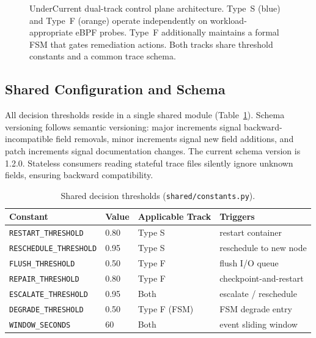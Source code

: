 \documentclass[runningheads]{llncs}
\begin{document}
\begin{figure}[t]
\caption{UnderCurrent dual-track control plane architecture.
Type~S (blue) and Type~F (orange) operate independently on
workload-appropriate eBPF probes. Type~F additionally maintains a
formal FSM that gates remediation actions. Both tracks share
threshold constants and a common trace schema.}
\label{fig:architecture}
\end{figure}

\subsection{Shared Configuration and Schema}

All decision thresholds reside in a single shared module
(Table~\ref{tab:thresholds}).  Schema versioning follows semantic
versioning: major increments signal backward-incompatible field
removals, minor increments signal new field additions, and patch
increments signal documentation changes.  The current schema version is
1.2.0. Stateless consumers reading stateful trace files silently ignore
unknown fields, ensuring backward compatibility.

\begin{table}[t]
\centering
\caption{Shared decision thresholds (\texttt{shared/constants.py}).}
\label{tab:thresholds}
\begin{tabular}{llll}
\toprule
\textbf{Constant} & \textbf{Value} & \textbf{Applicable Track} & \textbf{Triggers} \\
\midrule
\texttt{RESTART\_THRESHOLD}    & 0.80 & Type S        & restart container \\
\texttt{RESCHEDULE\_THRESHOLD} & 0.95 & Type S        & reschedule to new node \\
\texttt{FLUSH\_THRESHOLD}      & 0.50 & Type F        & flush I/O queue \\
\texttt{REPAIR\_THRESHOLD}     & 0.80 & Type F        & checkpoint-and-restart \\
\texttt{ESCALATE\_THRESHOLD}   & 0.95 & Both          & escalate / reschedule \\
\texttt{DEGRADE\_THRESHOLD}    & 0.50 & Type F (FSM)  & FSM degrade entry \\
\texttt{WINDOW\_SECONDS}       & 60   & Both          & event sliding window \\
\bottomrule
\end{tabular}
\end{table}
\end{document}
